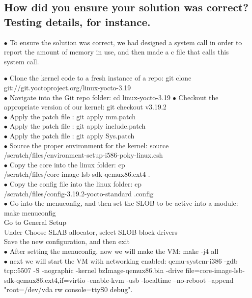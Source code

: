 \documentclass[letterpaper,10pt,fleqn,draftclsnofoot,onecolumn]{IEEEtran}
\begin{document}
	\subsection{How did you ensure your solution was correct? Testing details, for instance.}
	$\bullet$ To ensure the solution was correct, we had designed a system call in order to report the amount of memory in use, and then made a c file that calls this system call.
	
	
	$\bullet$ Clone the kernel code to a fresh instance of a repo: git clone git://git.yoctoproject.org/linux-yocto-3.19\\
	$\bullet$ Navigate into the Git repo folder: cd linux-yocto-3.19
	$\bullet$ Checkout the appropriate version of our kernel: git checkout v3.19.2\\
	$\bullet$ Apply the patch file : git apply mm.patch\\
	$\bullet$ Apply the patch file : git apply include.patch\\
	$\bullet$ Apply the patch file : git apply Sys.patch\\
	$\bullet$ Source the proper environment for the kernel: source\\ /scratch/files/environment-setup-i586-poky-linux.csh\\
	$\bullet$ Copy the core into the linux folder: cp\\ /scratch/files/core-image-lsb-sdk-qemux86.ext4 .\\
	$\bullet$ Copy the config file into the linux folder: cp\\ /scratch/files/config-3.19.2-yocto-standard .config\\
	$\bullet$ Go into the menuconfig, and then set the SLOB to be active  into a module:\\
	make menuconfig\\
	Go to General Setup\\
	Under Choose SLAB allocator, select SLOB block drivers\\
	Save the new configuration, and then exit\\
	$\bullet$ After setting the menuconfig, now we will make the VM: make -j4 all\\
	$\bullet$ next we will start the VM with networking enabled: qemu-system-i386 -gdb tcp::5507 -S -nographic -kernel bzImage-qemux86.bin -drive file=core-image-lsb-sdk-qemux86.ext4,if=virtio -enable-kvm -usb -localtime --no-reboot --append "root=/dev/vda rw console=ttyS0 debug".\\
\end{document}
